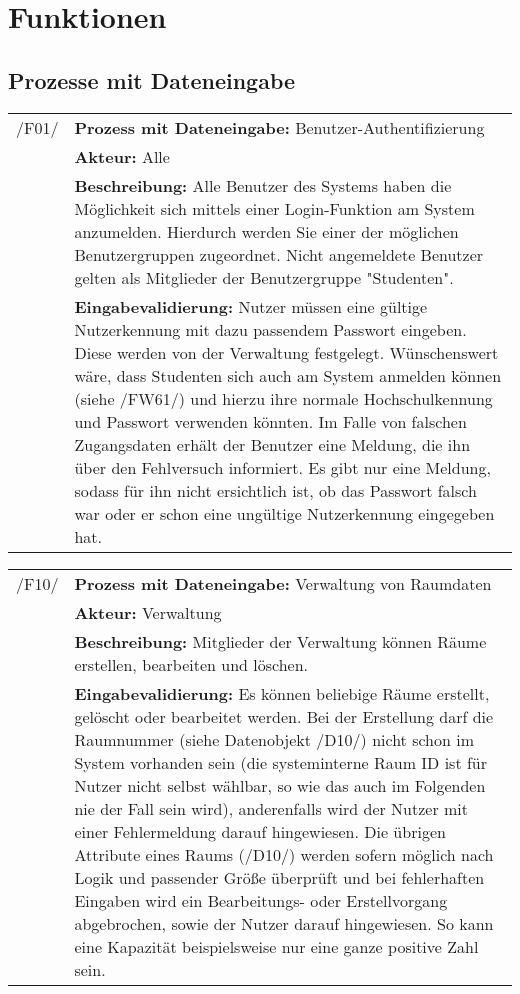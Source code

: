 \section{Funktionen}

\subsection{Prozesse mit Dateneingabe}

\begin{tabular}{p{1.5cm}p{14.5cm}}


	 /F01/	& \textbf{Prozess mit Dateneingabe:} Benutzer-Authentifizierung \\
				& \textbf{Akteur:} Alle \\
				& \textbf{Beschreibung:} Alle Benutzer des Systems haben die Möglichkeit sich mittels einer Login-Funktion am System anzumelden. Hierdurch werden Sie einer der möglichen Benutzergruppen zugeordnet. Nicht angemeldete Benutzer gelten als Mitglieder der Benutzergruppe "Studenten". \\
				& \textbf{Eingabevalidierung:} Nutzer müssen eine gültige Nutzerkennung mit dazu passendem Passwort eingeben. Diese werden von der Verwaltung festgelegt. Wünschenswert wäre, dass Studenten sich auch am System anmelden können (siehe /FW61/) und hierzu ihre normale Hochschulkennung und Passwort verwenden könnten. Im Falle von falschen Zugangsdaten erhält der Benutzer eine Meldung, die ihn über den Fehlversuch informiert. Es gibt nur eine Meldung, sodass für ihn nicht ersichtlich ist, ob das Passwort falsch war oder er schon eine ungültige Nutzerkennung eingegeben hat.\\[0.25cm]

\end{tabular}


\begin{tabular}{p{1.5cm}p{14.5cm}}
		
	 /F10/	& \textbf{Prozess mit Dateneingabe:} Verwaltung von Raumdaten \\
				& \textbf{Akteur:} Verwaltung \\
				& \textbf{Beschreibung:} Mitglieder der Verwaltung können Räume erstellen, bearbeiten und löschen. \\
				& \textbf{Eingabevalidierung:} Es können beliebige Räume erstellt, gelöscht oder bearbeitet werden. Bei der Erstellung darf die Raumnummer (siehe Datenobjekt /D10/) nicht schon im System vorhanden sein (die systeminterne Raum ID ist für Nutzer nicht selbst wählbar, so wie das auch im Folgenden nie der Fall sein wird), anderenfalls wird der Nutzer mit einer Fehlermeldung darauf hingewiesen. Die übrigen Attribute eines Raums (/D10/) werden sofern möglich nach Logik und passender Größe überprüft und bei fehlerhaften Eingaben wird ein Bearbeitungs- oder Erstellvorgang abgebrochen, sowie der Nutzer darauf hingewiesen. So kann eine Kapazität beispielsweise nur eine ganze positive Zahl sein. \\[0.25cm]

\end{tabular}


